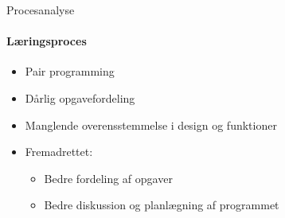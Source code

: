 \begin{frame}{Procesanalyse}
	\framesubtitle{Læringsproces}
	
	\begin{itemize}
		\item Pair programming
		\item Dårlig opgavefordeling
		\item Manglende overensstemmelse i design og funktioner
		\item Fremadrettet:
		\begin{itemize}
			\item Bedre fordeling af opgaver
			\item Bedre diskussion og planlægning af programmet
		\end{itemize}
	\end{itemize}

\end{frame}